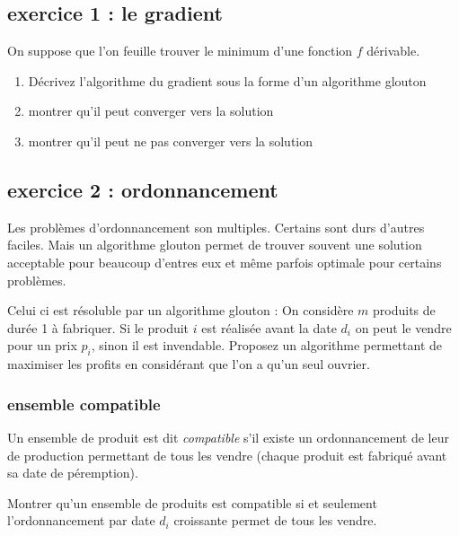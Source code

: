 \documentclass[
]{article}
\providecommand{\tightlist}{%
  \setlength{\itemsep}{0pt}\setlength{\parskip}{0pt}}
\begin{document}
\hypertarget{exercice-1-le-gradient}{%
\subsection{exercice 1 : le gradient}\label{exercice-1-le-gradient}}

On suppose que l'on feuille trouver le minimum d'une fonction \(f\)
dérivable.

\begin{enumerate}
\def\labelenumi{\arabic{enumi}.}
\tightlist
\item
  Décrivez l'algorithme du gradient sous la forme d'un algorithme
  glouton
\item
  montrer qu'il peut converger vers la solution
\item
  montrer qu'il peut ne pas converger vers la solution
\end{enumerate}

\hypertarget{exercice-2-ordonnancement}{%
\subsection{exercice 2 :
ordonnancement}\label{exercice-2-ordonnancement}}

Les problèmes d'ordonnancement son multiples. Certains sont durs
d'autres faciles. Mais un algorithme glouton permet de trouver souvent
une solution acceptable pour beaucoup d'entres eux et même parfois
optimale pour certains problèmes.

Celui ci est résoluble par un algorithme glouton : On considère \(m\)
produits de durée 1 à fabriquer. Si le produit \(i\) est réalisée avant
la date \(d_i\) on peut le vendre pour un prix \(p_i\), sinon il est
invendable. Proposez un algorithme permettant de maximiser les profits
en considérant que l'on a qu'un seul ouvrier.

\hypertarget{ensemble-compatible}{%
\subsubsection{ensemble compatible}\label{ensemble-compatible}}

Un ensemble de produit est dit \emph{compatible} s'il existe un
ordonnancement de leur de production permettant de tous les vendre
(chaque produit est fabriqué avant sa date de péremption).

Montrer qu'un ensemble de produits est compatible si et seulement
l'ordonnancement par date \(d_i\) croissante permet de tous les vendre.
\end{document}
